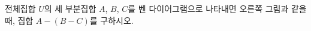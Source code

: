 \noindent\begin{minipage}[t]{0.58\linewidth}\vspace{0pt}\raggedright 전체집합 $U$의 세 부분집합 $A$, $B$, $C$를 벤 다이어그램으로 나타내면 오른쪽 그림과 같을 때, 집합 $A-(B-C)$를 구하시오.\end{minipage}\hfill\begin{minipage}[t]{0.4\linewidth}\vspace{0pt}\centering \resizebox{\ifdim\width>\linewidth\linewidth\else\width\fi}{!}{}\end{minipage}\par
